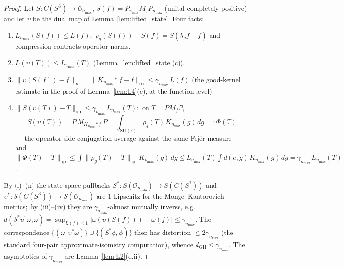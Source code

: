 \documentclass[11pt,a4paper]{article}
\theoremstyle{plain}
\theoremstyle{definition}
\newcommand{\nmax}{n_{\max}}
\newcommand{\sthree}{S^{3}}
\newcommand{\Op}{\mathcal{O}}
\newcommand{\opnorm}[1]{\lVert #1 \rVert_{\mathrm{op}}}
\newcommand{\norm}[1]{\lVert #1 \rVert}
\newcommand{\SU}{\mathrm{SU}}
\newcommand{\KS}{K}
\begin{document}
\begin{proof}
Let $S : C(\sthree) \to \Op_{\nmax}$, $S(f) = P_{\nmax} M_f
P_{\nmax}$ (unital completely positive) and let $\upsilon$ be the
dual map of Lemma~\ref{lem:lifted_state}. Four facts:
\begin{enumerate}\setlength{\itemsep}{1pt}
\item[(i)] $L_{\nmax}(S(f)) \le L(f)$:\ $\rho_g(S(f)) - S(f) =
S(\lambda_g f - f)$ and compression contracts operator norms.
\item[(ii)] $L(\upsilon(T)) \le L_{\nmax}(T)$
(Lemma~\ref{lem:lifted_state}(c)).
\item[(iii)] $\norm{\upsilon(S(f)) - f}_\infty =
\norm{\KS_{\nmax} * f - f}_\infty \le \gamma_{\nmax}\, L(f)$ (the
good-kernel estimate in the proof of Lemma~\ref{lem:L4}(c), at the
function level).
\item[(iv)] $\opnorm{S(\upsilon(T)) - T} \le \gamma_{\nmax}\,
L_{\nmax}(T)$:\ on $T = P M_f P$,
\begin{equation*}
S(\upsilon(T)) = P\, M_{\KS_{\nmax} * f}\, P
= \int_{\SU(2)} \rho_g(T)\, \KS_{\nmax}(g)\, dg =: \Phi(T)
\end{equation*}
--- the operator-side conjugation average against the same Fej\'er
measure --- and $\opnorm{\Phi(T) - T} \le \int \opnorm{\rho_g(T) -
T}\, \KS_{\nmax}(g)\, dg \le L_{\nmax}(T) \int d(e, g)\,
\KS_{\nmax}(g)\, dg = \gamma_{\nmax}\, L_{\nmax}(T)$.
\end{enumerate}
By (i)--(ii) the state-space pullbacks $S^* : S(\Op_{\nmax}) \to
S(C(\sthree))$ and $\upsilon^* : S(C(\sthree)) \to S(\Op_{\nmax})$
are $1$-Lipschitz for the Monge--Kantorovich metrics;\ by
(iii)--(iv) they are $\gamma_{\nmax}$-almost mutually inverse, e.g.\
$d(S^*\upsilon^*\omega, \omega) = \sup_{L(f) \le 1}
|\omega(\upsilon(S(f))) - \omega(f)| \le \gamma_{\nmax}$. The
correspondence $\{(\omega, \upsilon^*\omega)\} \cup \{(S^*\phi,
\phi)\}$ then has distortion $\le 2\gamma_{\nmax}$ (the standard
four-pair approximate-isometry computation), whence
$d_{\mathrm{GH}} \le \gamma_{\nmax}$. The asymptotics of $\gamma_{\nmax}$ are
Lemma~\ref{lem:L2}(d.ii). \qedhere
\end{proof}
\end{document}
